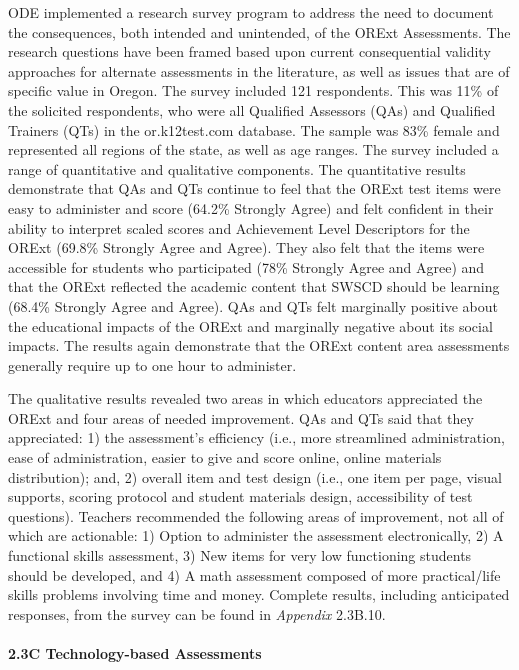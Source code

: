 \documentclass[]{article}
\let\oldparagraph\paragraph
\renewcommand{\paragraph}[1]{\oldparagraph{#1}\mbox{}}
\begin{document}
ODE implemented a research survey program to address the need to
document the consequences, both intended and unintended, of the ORExt
Assessments. The research questions have been framed based upon current
consequential validity approaches for alternate assessments in the
literature, as well as issues that are of specific value in Oregon. The
survey included 121 respondents. This was 11\% of the solicited
respondents, who were all Qualified Assessors (QAs) and Qualified
Trainers (QTs) in the or.k12test.com database. The sample was 83\%
female and represented all regions of the state, as well as age ranges.
The survey included a range of quantitative and qualitative components.
The quantitative results demonstrate that QAs and QTs continue to feel
that the ORExt test items were easy to administer and score (64.2\%
Strongly Agree) and felt confident in their ability to interpret scaled
scores and Achievement Level Descriptors for the ORExt (69.8\% Strongly
Agree and Agree). They also felt that the items were accessible for
students who participated (78\% Strongly Agree and Agree) and that the
ORExt reflected the academic content that SWSCD should be learning
(68.4\% Strongly Agree and Agree). QAs and QTs felt marginally positive
about the educational impacts of the ORExt and marginally negative about
its social impacts. The results again demonstrate that the ORExt content
area assessments generally require up to one hour to administer.

The qualitative results revealed two areas in which educators
appreciated the ORExt and four areas of needed improvement. QAs and QTs
said that they appreciated: 1) the assessment's efficiency (i.e., more
streamlined administration, ease of administration, easier to give and
score online, online materials distribution); and, 2) overall item and
test design (i.e., one item per page, visual supports, scoring protocol
and student materials design, accessibility of test questions). Teachers
recommended the following areas of improvement, not all of which are
actionable: 1) Option to administer the assessment electronically, 2) A
functional skills assessment, 3) New items for very low functioning
students should be developed, and 4) A math assessment composed of more
practical/life skills problems involving time and money. Complete
results, including anticipated responses, from the survey can be found
in \emph{Appendix} 2.3B.10.

\paragraph{2.3C Technology-based
Assessments}\label{c-technology-based-assessments}
\end{document}
